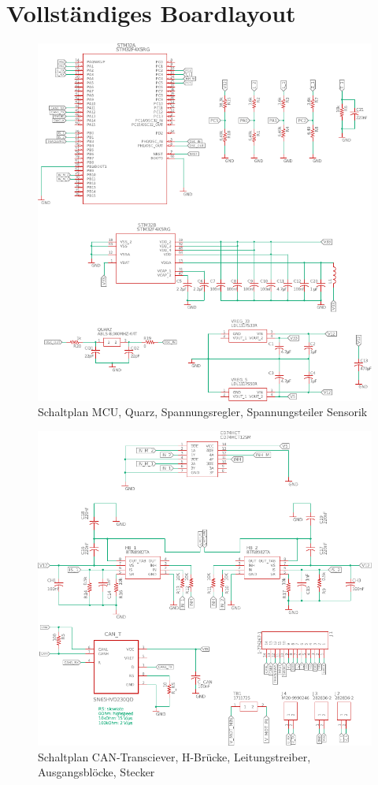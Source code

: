\appendix
\chapter{Vollständiges Boardlayout}\label{app:boardlayout}
\begin{figure}[H]%
\centering
\includegraphics[angle=0,width=1
\columnwidth]{./Bilder/schem_app_1}%
\caption{Schaltplan MCU, Quarz, Spannungsregler, Spannungsteiler Sensorik}%
\label{}%
\end{figure}\newpage
\begin{figure}[H]%
\centering
\includegraphics[angle=0,width=1
\columnwidth]{./Bilder/schem_app_2}%
\caption{Schaltplan CAN-Transciever, H-Brücke, Leitungstreiber, Ausgangsblöcke, Stecker}%
\label{}%
\end{figure}\newpage
